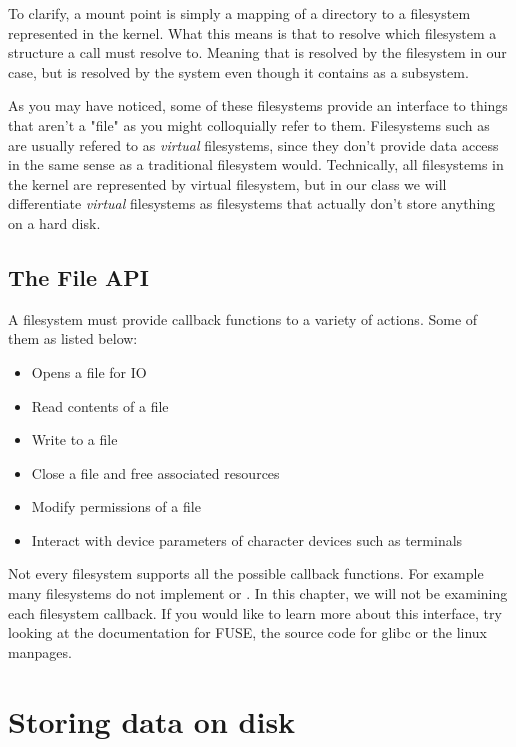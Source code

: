 To clarify, a mount point is simply a mapping of a directory to a filesystem represented in the kernel. What this means is that to resolve which filesystem a structure a call must resolve to. Meaning that  is resolved by the  filesystem in our case, but  is resolved by the  system even though it contains \keyword{/} as a subsystem.

As you may have noticed, some of these filesystems provide an interface to things that aren't a "file" as you might colloquially refer to them. Filesystems such as  are usually refered to as \emph{virtual} filesystems, since they don't provide data access in the same sense as a traditional filesystem would. Technically, all filesystems in the kernel are represented by virtual filesystem, but in our class we will differentiate \emph{virtual} filesystems as filesystems that actually don't store anything on a hard disk.

\subsection{The File API}

A filesystem must provide callback functions to a variety of actions. Some of them as listed below:

\begin{itemize}
  \item {} Opens a file for IO
  \item {} Read contents of a file 
  \item {} Write to a file 
  \item {} Close a file and free associated resources
  \item {} Modify permissions of a file
  \item {} Interact with device parameters of character devices such as terminals
\end{itemize}

Not every filesystem supports all the possible callback functions. For example many filesystems do not implement  or . In this chapter, we will not be examining each filesystem callback. If you would like to learn more about this interface, try looking at the documentation for FUSE, the source code for glibc or the linux manpages.

\section{Storing data on disk}

